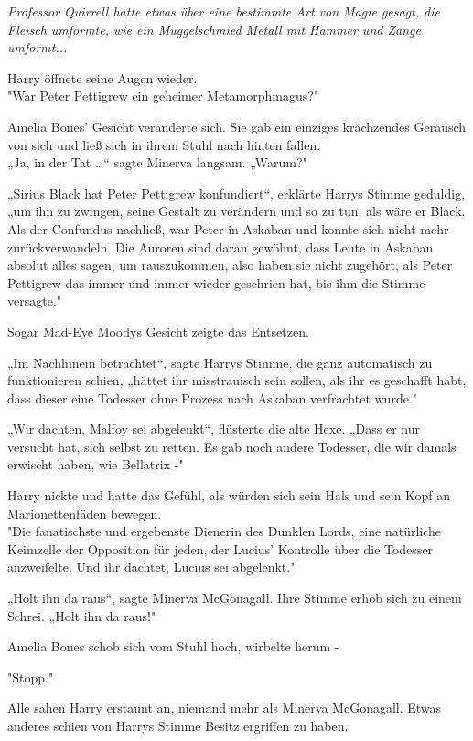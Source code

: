 {\emph{Professor Quirrell hatte etwas über eine bestimmte Art von Magie gesagt, die Fleisch umformte, wie ein Muggelschmied Metall mit Hammer und Zange umformt...}

Harry öffnete seine Augen wieder.\\ "War Peter Pettigrew ein geheimer Metamorphmagus?"

Amelia Bones' Gesicht veränderte sich. Sie gab ein einziges krächzendes Geräusch von sich und ließ sich in ihrem Stuhl nach hinten fallen.\\ „Ja, in der Tat …“ sagte Minerva langsam. „Warum?"

„Sirius Black hat Peter Pettigrew konfundiert“, erklärte Harrys Stimme geduldig,\\ „um ihn zu zwingen, seine Gestalt zu verändern und so zu tun, als wäre er Black.\\ Als der Confundus nachließ, war Peter in Askaban und konnte sich nicht mehr zurückverwandeln. Die Auroren sind daran gewöhnt, dass Leute in Askaban absolut alles sagen, um rauszukommen, also haben sie nicht zugehört, als Peter Pettigrew das immer und immer wieder geschrien hat, bis ihm die Stimme versagte."

Sogar Mad-Eye Moodys Gesicht zeigte das Entsetzen.

„Im Nachhinein betrachtet“, sagte Harrys Stimme, die ganz automatisch zu funktionieren schien, „hättet ihr misstrauisch sein sollen, als ihr es geschafft habt, dass dieser eine Todesser ohne Prozess nach Askaban verfrachtet wurde."

„Wir dachten, Malfoy sei abgelenkt“, flüsterte die alte Hexe. „Dass er nur versucht hat, sich selbst zu retten. Es gab noch andere Todesser, die wir damals erwischt haben, wie Bellatrix -"

Harry nickte und hatte das Gefühl, als würden sich sein Hals und sein Kopf an Marionettenfäden bewegen.\\ "Die fanatischste und ergebenste Dienerin des Dunklen Lords, eine natürliche Keimzelle der Opposition für jeden, der Lucius' Kontrolle über die Todesser anzweifelte. Und ihr dachtet, Lucius sei abgelenkt."

„Holt ihn da raus“, sagte Minerva McGonagall. Ihre Stimme erhob sich zu einem Schrei. „Holt ihn da raus!"

Amelia Bones schob sich vom Stuhl hoch, wirbelte herum -

"Stopp."

Alle sahen Harry erstaunt an, niemand mehr als Minerva McGonagall. Etwas anderes schien von Harrys Stimme Besitz ergriffen zu haben.

}
